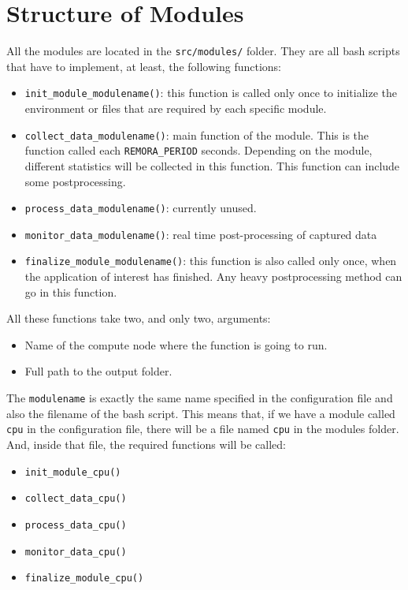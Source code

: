 \documentclass[10pt,a4paper]{report}
\begin{document}
\section{Structure of Modules}

All the modules are located in the \verb+src/modules/+ folder. They are all bash scripts that have to implement, at least, the following functions:

\begin{itemize}
	\item \texttt{init\_module\_modulename()}: this function is called only once to initialize the environment or files that are required by each specific module.
	\item \texttt{collect\_data\_modulename()}: main function of the module. This is the function called each \texttt{REMORA\_PERIOD} seconds. Depending on the module, different statistics will be collected in this function. This function can include some postprocessing.
	\item \texttt{process\_data\_modulename()}: currently unused.
	\item \texttt{monitor\_data\_modulename()}: real time post-processing of captured data
	\item \texttt{finalize\_module\_modulename()}: this function is also called only once, when the application of interest has finished. Any heavy postprocessing method can go in this function.
\end{itemize}

All these functions take two, and only two, arguments:
\begin{itemize}
	\item Name of the compute node where the function is going to run.
	\item Full path to the output folder.
\end{itemize}

The \texttt{modulename} is exactly the same name specified in the configuration file and also the filename of the bash script. This means that, if we have a module called \texttt{cpu} in the configuration file, there will be a file named \texttt{cpu} in the modules folder. And, inside that file, the required functions will be called:

\begin{itemize}
	\item \texttt{init\_module\_cpu()}
	\item \texttt{collect\_data\_cpu()}
	\item \texttt{process\_data\_cpu()}
	\item \texttt{monitor\_data\_cpu()}
	\item \texttt{finalize\_module\_cpu()}
\end{itemize}
\end{document}

